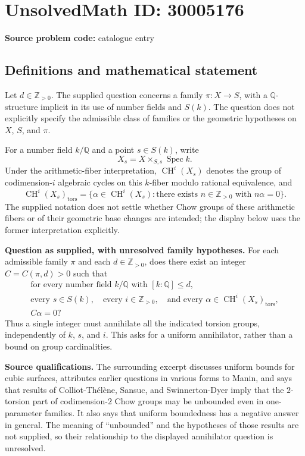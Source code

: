 \documentclass[11pt]{article}
\newcommand{\Z}{\mathbb{Z}}
\newcommand{\Q}{\mathbb{Q}}
\begin{document}
\section*{UnsolvedMath ID: 30005176}
\textbf{Source problem code:} catalogue entry
\subsection{Definitions and mathematical statement}
Let \(d\in\Z_{>0}\). The supplied question concerns a family \(\pi:X\to S\), with a \(\Q\)-structure implicit in its use of number fields and \(S(k)\). The question does not explicitly specify the admissible class of families or the geometric hypotheses on \(X\), \(S\), and \(\pi\).

For a number field \(k/\Q\) and a point \(s\in S(k)\), write
\[
X_s=X\times_{S,s}\operatorname{Spec}k.
\]
Under the arithmetic-fiber interpretation, \(\operatorname{CH}^i(X_s)\) denotes the group of codimension-\(i\) algebraic cycles on this \(k\)-fiber modulo rational equivalence, and
\[
\operatorname{CH}^i(X_s)_{\mathrm{tors}}
=\{\alpha\in\operatorname{CH}^i(X_s):\text{there exists }n\in\Z_{>0}\text{ with }n\alpha=0\}.
\]
The supplied notation does not settle whether Chow groups of these arithmetic fibers or of their geometric base changes are intended; the display below uses the former interpretation explicitly.

\textbf{Question as supplied, with unresolved family hypotheses.} For each admissible family \(\pi\) and each \(d\in\Z_{>0}\), does there exist an integer \(C=C(\pi,d)>0\) such that
\[
\begin{gathered}
\text{for every number field }k/\Q\text{ with }[k:\Q]\le d,\\
\text{every }s\in S(k),\quad\text{every }i\in\Z_{>0},\quad
\text{and every }\alpha\in\operatorname{CH}^i(X_s)_{\mathrm{tors}},\\
C\alpha=0?
\end{gathered}
\]
Thus a single integer must annihilate all the indicated torsion groups, independently of \(k\), \(s\), and \(i\). This asks for a uniform annihilator, rather than a bound on group cardinalities.

\textbf{Source qualifications.} The surrounding excerpt discusses uniform bounds for cubic surfaces, attributes earlier questions in various forms to Manin, and says that results of Colliot-Th\'el\`ene, Sansuc, and Swinnerton-Dyer imply that the \(2\)-torsion part of codimension-\(2\) Chow groups may be unbounded even in one-parameter families. It also says that uniform boundedness has a negative answer in general. The meaning of ``unbounded'' and the hypotheses of those results are not supplied, so their relationship to the displayed annihilator question is unresolved.
\end{document}
